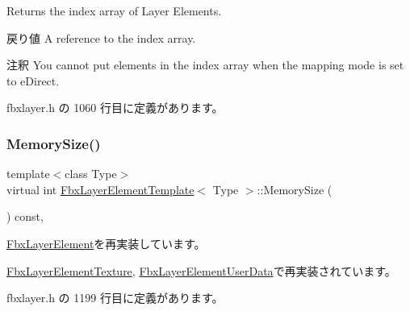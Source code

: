 Returns the index array of Layer Elements. \begin{DoxyReturn}{戻り値}
A reference to the index array. 
\end{DoxyReturn}
\begin{DoxyRemark}{注釈}
You cannot put elements in the index array when the mapping mode is set to e\+Direct. 
\end{DoxyRemark}


 fbxlayer.\+h の 1060 行目に定義があります。

\mbox{\label{class_fbx_layer_element_template_aa6a7b5ed38b51d4a903f9ed2e715ee79}} 
\subsubsection{\texorpdfstring{Memory\+Size()}{MemorySize()}}
{\footnotesize\ttfamily template$<$class Type$>$ \\
virtual int \hyperlink{class_fbx_layer_element_template}{Fbx\+Layer\+Element\+Template}$<$ Type $>$\+::Memory\+Size (\begin{DoxyParamCaption}{ }\end{DoxyParamCaption}) const\hspace{0.3cm}{\ttfamily [inline]}, {\ttfamily [virtual]}}



\hyperlink{class_fbx_layer_element_a15654a170f2d2952bf1eafad65262b8b}{Fbx\+Layer\+Element}を再実装しています。



\hyperlink{class_fbx_layer_element_texture_aa6ee4c7c56a71d1a3f70fa4e0806e1f5}{Fbx\+Layer\+Element\+Texture}, \hyperlink{class_fbx_layer_element_user_data_aa02fc5861dec4da68293f9660d4ff13b}{Fbx\+Layer\+Element\+User\+Data}で再実装されています。



 fbxlayer.\+h の 1199 行目に定義があります。

\mbox{\label{class_fbx_layer_element_template_ab92b474682b154297b72188986684fd7}} 
